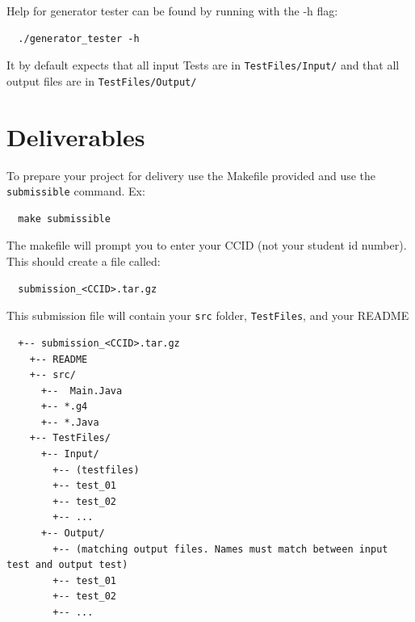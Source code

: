 \documentclass{article}
\begin{document}
Help for generator tester can be found by running with the -h flag:
\begin{lstlisting}
  ./generator_tester -h
\end{lstlisting}

It by default expects that all input Tests are in \texttt{TestFiles/Input/} and that  all output files are in
\texttt{TestFiles/Output/}

\section{Deliverables}
To prepare your project for delivery use the Makefile provided and use the \texttt{submissible} command. Ex:
\begin{lstlisting}
  make submissible
\end{lstlisting}

The makefile will prompt you to enter your CCID (not your student id number). This should create a file called:
\begin{lstlisting}
  submission_<CCID>.tar.gz
\end{lstlisting}

This submission file will contain your \texttt{src} folder, \texttt{TestFiles}, and your README
\begin{lstlisting}
  +-- submission_<CCID>.tar.gz
    +-- README
    +-- src/
      +--  Main.Java
      +-- *.g4
      +-- *.Java
    +-- TestFiles/
      +-- Input/
        +-- (testfiles)
        +-- test_01
        +-- test_02
        +-- ...
      +-- Output/
        +-- (matching output files. Names must match between input test and output test)
        +-- test_01
        +-- test_02
        +-- ...
\end{lstlisting}
\end{document}
